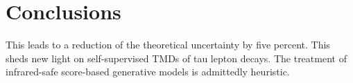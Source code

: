 \section{Conclusions}\label{sec:conclusions}

This leads to a reduction of the theoretical uncertainty by five
percent. This sheds new light on self-supervised TMDs of tau lepton
decays. The treatment of infrared-safe score-based generative models is
admittedly heuristic.

